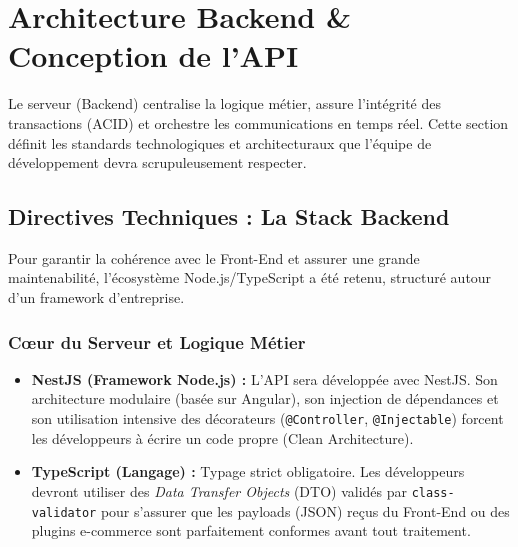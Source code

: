 \newpage



\section{Architecture Backend \& Conception de l'API}
\label{sec:architecture_backend}

Le serveur (Backend) centralise la logique métier, assure l'intégrité des transactions (ACID) et orchestre les communications en temps réel. Cette section définit les standards technologiques et architecturaux que l'équipe de développement devra scrupuleusement respecter.

\subsection{Directives Techniques : La Stack Backend}

Pour garantir la cohérence avec le Front-End et assurer une grande maintenabilité, l'écosystème Node.js/TypeScript a été retenu, structuré autour d'un framework d'entreprise.

\subsubsection{Cœur du Serveur et Logique Métier}
\begin{itemize}
    \item \textbf{NestJS (Framework Node.js) :} L'API sera développée avec NestJS. Son architecture modulaire (basée sur Angular), son injection de dépendances et son utilisation intensive des décorateurs (\texttt{@Controller}, \texttt{@Injectable}) forcent les développeurs à écrire un code propre (Clean Architecture).
    \item \textbf{TypeScript (Langage) :} Typage strict obligatoire. Les développeurs devront utiliser des \textit{Data Transfer Objects} (DTO) validés par \texttt{class-validator} pour s'assurer que les payloads (JSON) reçus du Front-End ou des plugins e-commerce sont parfaitement conformes avant tout traitement.
\end{itemize}

